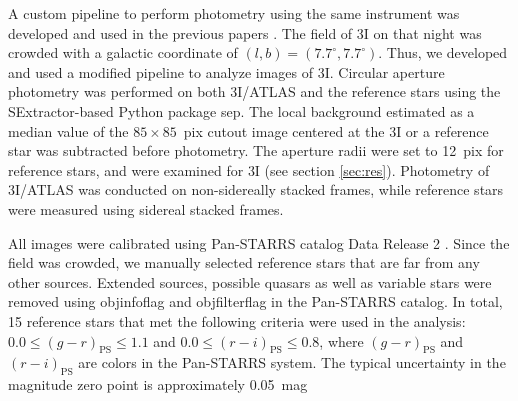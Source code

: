 \documentclass[]{pasj02}
\newcommand\I{3I/ATLAS\xspace}
\begin{document}
A custom pipeline to perform photometry using the same instrument was developed and used in the previous papers \citep{Beniyama2023a, Beniyama2023b, Beniyama2023c, Beniyama2024, Beniyama2025b}.
The field of 3I on that night was crowded with a galactic coordinate of $(l, b) = (7.7^{\circ}, 7.7^{\circ})$.
Thus, we developed and used a modified pipeline to analyze images of 3I.
Circular aperture photometry was performed on both \I and the reference stars using the SExtractor-based Python package sep. 
The local background estimated as a median value of the $85\times85$~pix cutout image centered at the 3I or a reference star was subtracted before photometry.
The aperture radii were set to 12~pix for reference stars, and were examined for 3I (see section \ref{sec:res}).
Photometry of \I was conducted on non-sidereally stacked frames, while reference stars were measured using sidereal stacked frames.

All images were calibrated using Pan-STARRS catalog Data Release 2 \citep{Chambers2016}.
Since the field was crowded, we manually selected reference stars that are far from any other sources.
Extended sources, possible quasars as well as variable stars were removed using objinfoflag and objfilterflag in the Pan-STARRS catalog.
In total, 15 reference stars that met the following criteria were used in the analysis:
$0.0 \leq (g-r)_{\mathrm{PS}} \leq 1.1$ and $0.0 \leq (r-i)_{\mathrm{PS}} \leq 0.8$, where $(g-r)_{\mathrm{PS}}$ and $(r-i)_{\mathrm{PS}}$ are colors in the Pan-STARRS system.
The typical uncertainty in the magnitude zero point is approximately 0.05~mag
\end{document}
